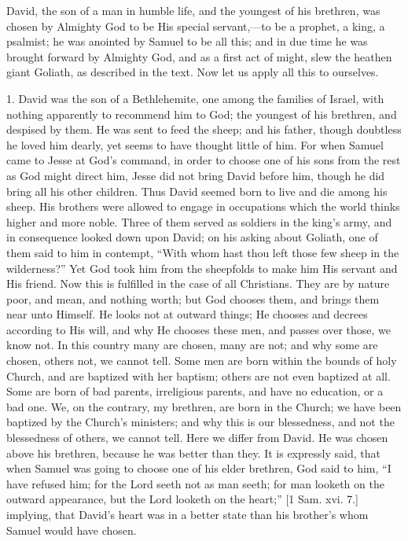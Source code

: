 David, the son of a man in humble life, and the youngest of his
brethren, was chosen by Almighty God to be His special servant,—to
be a prophet, a king, a psalmist; he was anointed by Samuel to be all
this; and in due time he was brought forward by Almighty God, and as a
first act of might, slew the heathen giant Goliath, as described in
the text. Now let us apply all this to ourselves.

1. David was the son of a Bethlehemite, one among the families of
Israel, with nothing apparently to recommend him to God; the youngest
of his brethren, and despised by them. He was sent to feed the sheep;
and his father, though doubtless he loved him dearly, yet seems to
have thought little of him. For when Samuel came to Jesse at God's
command, in order to choose one of his sons from the rest as God might
direct him, Jesse did not bring David before him, though he did bring
all his other children. Thus David seemed born to live and die among
his sheep. His brothers were allowed to engage in occupations which
the world thinks higher and more noble. Three of them served as
soldiers in the king's army, and in consequence looked down upon
David; on his asking about Goliath, one of them said to him in
contempt, ``With whom hast thou left those few sheep in the
wilderness?'' Yet God took him from the sheepfolds to make him His
servant and His friend. Now this is fulfilled in the case of all
Christians. They are by nature poor, and mean, and nothing worth; but
God chooses them, and brings them near unto Himself. He looks not at
outward things; He chooses and decrees according to His will, and why
He chooses these men, and passes over those, we know not. In this
country many are chosen, many are not; and why some are chosen, others
not, we cannot tell. Some men are born within the bounds of holy
Church, and are baptized with her baptism; others are not even
baptized at all. Some are born of bad parents, irreligious parents,
and have no education, or a bad one. We, on the contrary, my brethren,
are born in the Church; we have been baptized by the Church's
ministers; and why this is our blessedness, and not the blessedness of
others, we cannot tell. Here we differ from David. He was chosen above
his brethren, because he was better than they. It is expressly said,
that when Samuel was going to choose one of his elder brethren, God
said to him, ``I have refused him; for the Lord seeth not as man
seeth; for man looketh on the outward appearance, but the Lord looketh
on the heart;'' [1 Sam. xvi. 7.] implying, that David's heart was
in a better state than his brother's whom Samuel would have chosen.
